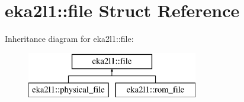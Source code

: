 \hypertarget{structeka2l1_1_1file}{}\section{eka2l1\+:\+:file Struct Reference}
\label{structeka2l1_1_1file}
Inheritance diagram for eka2l1\+:\+:file\+:\begin{figure}[H]
\begin{center}
\leavevmode
\includegraphics[height=2.000000cm]{structeka2l1_1_1file}
\end{center}
\end{figure}
